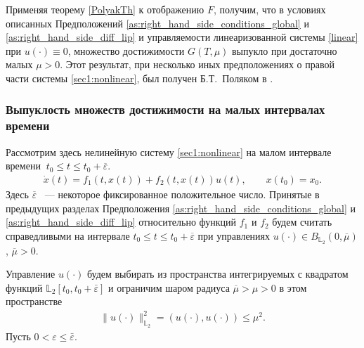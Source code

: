 \documentclass[../main.tex]{subfiles}
\begin{document}
	Применяя теорему \ref{PolyakTh} к отображению $F$, получим, что в условиях описанных Предположений \ref{as:right_hand_side_conditions_global} и \ref{as:right_hand_side_diff_lip} и управляемости линеаризованной системы \eqref{linear} при $u(\cdot) \equiv 0$, множество достижимости $G(T,\mu)$ выпукло при достаточно малых $\mu > 0$. Этот результат, при несколько иных предположениях о правой части системы \eqref{sec1:nonlinear}, был получен Б.Т.~Поляком в \cite{Polyak2004}.
	
    \subsubsection{Выпуклость множеств достижимости на малых интервалах времени}
    Рассмотрим здесь нелинейную систему \eqref{sec1:nonlinear} на малом интервале времени $\ t_0 \leqslant t \leqslant t_0 + \overline{\varepsilon} $.
    \begin{gather}\label{nonlinearT}
			\dot{x}(t)=f_1(t,x(t))+f_2(t,x(t))u(t), \qquad x(t_0) = x_0.
	\end{gather}
    Здесь $ \overline{\varepsilon} $ ~--- некоторое фиксированное положительное число. Принятые в предыдущих разделах Предположения \ref{as:right_hand_side_conditions_global} и \ref{as:right_hand_side_diff_lip} относительно функций $f_1$ и $f_2$ будем считать справедливыми на интервале $t_0 \leqslant t \leqslant t_0 + \overline{\varepsilon} $ при управлениях $u(\cdot) \in B_{\mathbb{L}_2}(0, \overline{\mu}) $, $\overline{\mu} > 0$.
   

     Управление $u(\cdot)$ будем выбирать из
    пространства интегрируемых с квадратом функций $\mathbb{L}_2[t_0,t_0+\bar{\varepsilon}]$ и ограничим шаром радиуса $ \overline{\mu} > \mu > 0 $ в этом пространстве
    \begin{gather*}
    	\lVert u(\cdot)\rVert^2_{\mathbb{L}_2} = \left(u(\cdot),u(\cdot) \right) \leqslant \mu^2.
    \end{gather*}
	Пусть $ 0 <  \varepsilon \leqslant \bar{\varepsilon} $.  
	
\end{document}
